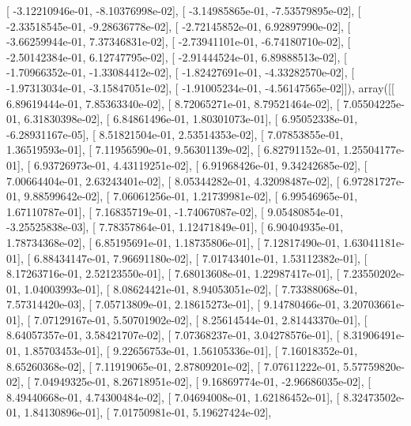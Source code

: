 \documentclass{article}
\begin{document}
       [ -3.12210946e-01,  -8.10376998e-02],
       [ -3.14985865e-01,  -7.53579895e-02],
       [ -2.33518545e-01,  -9.28636778e-02],
       [ -2.72145852e-01,   6.92897990e-02],
       [ -3.66259944e-01,   7.37346831e-02],
       [ -2.73941101e-01,  -6.74180710e-02],
       [ -2.50142384e-01,   6.12747795e-02],
       [ -2.91444524e-01,   6.89888513e-02],
       [ -1.70966352e-01,  -1.33084412e-02],
       [ -1.82427691e-01,  -4.33282570e-02],
       [ -1.97313034e-01,  -3.15847051e-02],
       [ -1.91005234e-01,  -4.56147565e-02]]), array([[  6.89619444e-01,   7.85363340e-02],
       [  8.72065271e-01,   8.79521464e-02],
       [  7.05504225e-01,   6.31830398e-02],
       [  6.84861496e-01,   1.80301073e-01],
       [  6.95052338e-01,  -6.28931167e-05],
       [  8.51821504e-01,   2.53514353e-02],
       [  7.07853855e-01,   1.36519593e-01],
       [  7.11956590e-01,   9.56301139e-02],
       [  6.82791152e-01,   1.25504177e-01],
       [  6.93726973e-01,   4.43119251e-02],
       [  6.91968426e-01,   9.34242685e-02],
       [  7.00664404e-01,   2.63243401e-02],
       [  8.05344282e-01,   4.32098487e-02],
       [  6.97281727e-01,   9.88599642e-02],
       [  7.06061256e-01,   1.21739981e-02],
       [  6.99546965e-01,   1.67110787e-01],
       [  7.16835719e-01,  -1.74067087e-02],
       [  9.05480854e-01,  -3.25525838e-03],
       [  7.78357864e-01,   1.12471849e-01],
       [  6.90404935e-01,   1.78734368e-02],
       [  6.85195691e-01,   1.18735806e-01],
       [  7.12817490e-01,   1.63041181e-01],
       [  6.88434147e-01,   7.96691180e-02],
       [  7.01743401e-01,   1.53112382e-01],
       [  8.17263716e-01,   2.52123550e-01],
       [  7.68013608e-01,   1.22987417e-01],
       [  7.23550202e-01,   1.04003993e-01],
       [  8.08624421e-01,   8.94053051e-02],
       [  7.73388068e-01,   7.57314420e-03],
       [  7.05713809e-01,   2.18615273e-01],
       [  9.14780466e-01,   3.20703661e-01],
       [  7.07129167e-01,   5.50701902e-02],
       [  8.25614544e-01,   2.81443370e-01],
       [  8.64057357e-01,   3.58421707e-02],
       [  7.07368237e-01,   3.04278576e-01],
       [  8.31906491e-01,   1.85703453e-01],
       [  9.22656753e-01,   1.56105336e-01],
       [  7.16018352e-01,   8.65260368e-02],
       [  7.11919065e-01,   2.87809201e-02],
       [  7.07611222e-01,   5.57759820e-02],
       [  7.04949325e-01,   8.26718951e-02],
       [  9.16869774e-01,  -2.96686035e-02],
       [  8.49440668e-01,   4.74300484e-02],
       [  7.04694008e-01,   1.62186452e-01],
       [  8.32473502e-01,   1.84130896e-01],
       [  7.01750981e-01,   5.19627424e-02],
\end{document}
